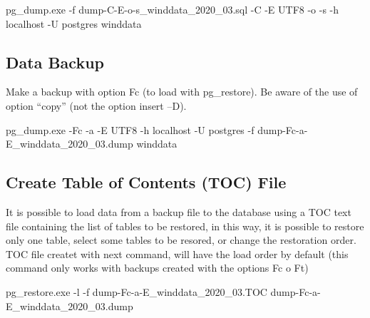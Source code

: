 \documentclass[12pt,oneside]{reedthesis}
\newenvironment{Shaded}{\begin{snugshade}}{\end{snugshade}}
\newcommand{\ExtensionTok}[1]{#1}
\newcommand{\NormalTok}[1]{#1}
\begin{document}
\scriptsize

\vspace{0.4cm}
\begin{Shaded}
\begin{Highlighting}[]
      \ExtensionTok{pg_dump.exe}\NormalTok{ -f dump-C-E-o-s_winddata_2020_03.sql -C -E UTF8 -o -s -h localhost -U postgres winddata}
\end{Highlighting}
\end{Shaded}
\normalsize

\hypertarget{data-backup}{%
\subsection{Data Backup}\label{data-backup}}

Make a backup with option Fc (to load with pg\_restore). Be aware of the use of option ``copy'' (not the option insert --D).

\scriptsize

\vspace{0.4cm}
\begin{Shaded}
\begin{Highlighting}[]
      \ExtensionTok{pg_dump.exe}\NormalTok{ -Fc -a -E UTF8 -h localhost -U postgres -f dump-Fc-a-E_winddata_2020_03.dump winddata}
\end{Highlighting}
\end{Shaded}
\normalsize

\hypertarget{create-table-of-contents-toc-file}{%
\subsection{Create Table of Contents (TOC) File}\label{create-table-of-contents-toc-file}}

It is possible to load data from a backup file to the database using a TOC text file containing the list of tables to be restored, in this way, it is possible to restore only one table, select some tables to be resored, or change the restoration order. TOC file createt with next command, will have the load order by default (this command only works with backups created with the options Fc o Ft)

\scriptsize

\vspace{0.4cm}
\begin{Shaded}
\begin{Highlighting}[]
      \ExtensionTok{pg_restore.exe}\NormalTok{ -l -f dump-Fc-a-E_winddata_2020_03.TOC dump-Fc-a-E_winddata_2020_03.dump}
\end{Highlighting}
\end{Shaded}
\normalsize
\end{document}
